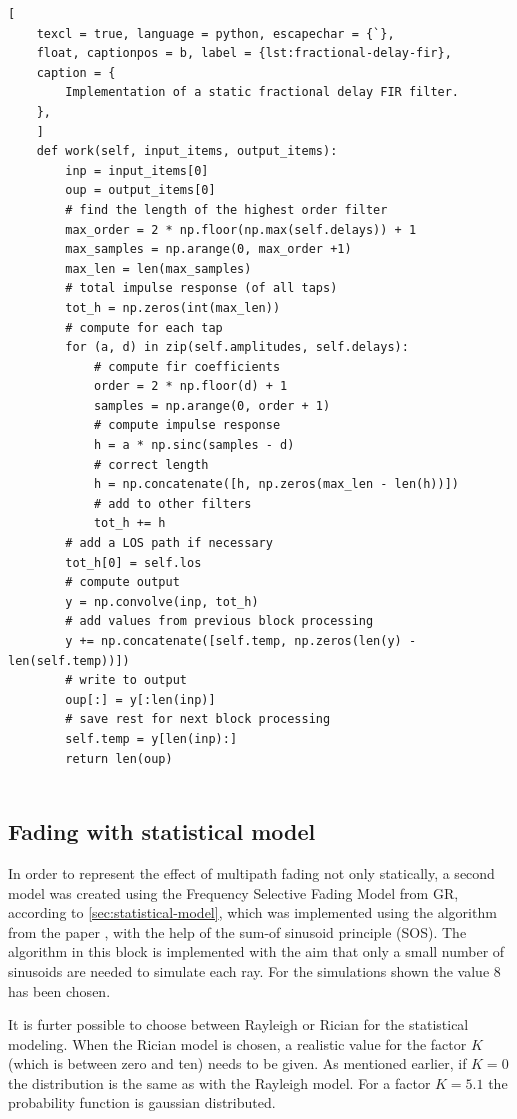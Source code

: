 \begin{lstlisting}[
	texcl = true, language = python, escapechar = {`},
	float, captionpos = b, label = {lst:fractional-delay-fir},
	caption = {
		Implementation of a static fractional delay FIR filter.
	},
	]
	def work(self, input_items, output_items):
		inp = input_items[0]
		oup = output_items[0]
		# find the length of the highest order filter
		max_order = 2 * np.floor(np.max(self.delays)) + 1
		max_samples = np.arange(0, max_order +1)
		max_len = len(max_samples)
		# total impulse response (of all taps)
		tot_h = np.zeros(int(max_len))
		# compute for each tap
		for (a, d) in zip(self.amplitudes, self.delays):
			# compute fir coefficients
			order = 2 * np.floor(d) + 1
			samples = np.arange(0, order + 1)
			# compute impulse response
			h = a * np.sinc(samples - d)
			# correct length
			h = np.concatenate([h, np.zeros(max_len - len(h))])
			# add to other filters
			tot_h += h
		# add a LOS path if necessary
		tot_h[0] = self.los
		# compute output
		y = np.convolve(inp, tot_h)
		# add values from previous block processing
		y += np.concatenate([self.temp, np.zeros(len(y) - len(self.temp))])
		# write to output
		oup[:] = y[:len(inp)]
		# save rest for next block processing
		self.temp = y[len(inp):]
		return len(oup)
	
\end{lstlisting}

\subsection{Fading with statistical model}

In order to represent the effect of multipath fading not only statically, a second model was created using the Frequency Selective Fading Model from GR, according to \ref{sec:statistical-model}, which was implemented using the algorithm from the paper \cite{Alimohammad2009}, with the help of the sum-of sinusoid principle (SOS). The algorithm in this block is implemented with the aim that only a small number of sinusoids are needed to simulate each ray. For the simulations shown the value 8 has been chosen.

It is furter possible to choose between Rayleigh or Rician for the statistical modeling. When the Rician model is chosen, a realistic value for the factor \(K\) (which is between zero and ten) needs to be given. As mentioned earlier, if \(K=0\) the distribution is the same as with the Rayleigh model. For a factor \(K = 5.1\) the probability function is gaussian distributed.

